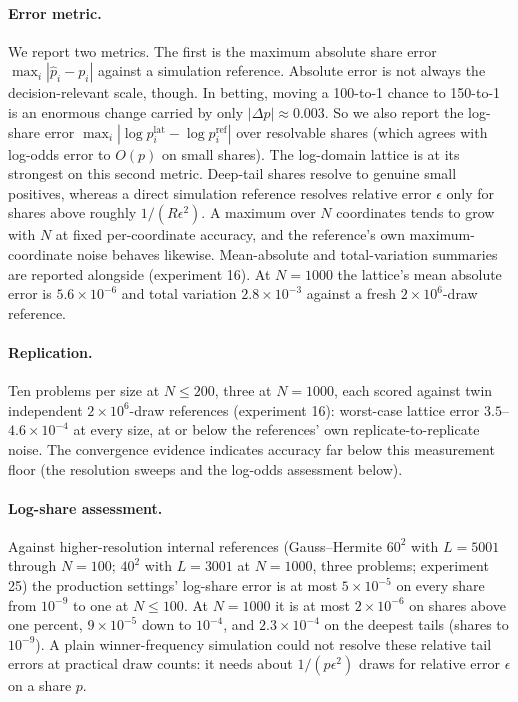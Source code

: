 \documentclass[12pt]{article}
\theoremstyle{remark}
\begin{document}
\paragraph{Error metric.} We report two metrics. The first is the
maximum absolute share error $\max_i |\hat p_i - p_i|$ against a
simulation reference. Absolute error is not always the decision-relevant
scale, though. In betting, moving a 100-to-1 chance to 150-to-1 is an
enormous change carried by only $|\Delta p| \approx 0.003$. So we also
report the log-share error $\max_i |\log p^{\mathrm{lat}}_i -
\log p_i^{\mathrm{ref}}|$ over resolvable shares (which agrees with
log-odds error to $O(p)$ on small shares). The log-domain lattice is at
its strongest on this second metric. Deep-tail shares resolve to genuine
small positives, whereas a direct simulation reference resolves relative
error $\epsilon$ only for shares above roughly $1/(R\epsilon^2)$. A maximum over $N$ coordinates tends to grow with $N$ at fixed
per-coordinate accuracy, and the reference's own maximum-coordinate noise
behaves likewise. Mean-absolute and total-variation summaries are
reported alongside (experiment 16). At $N=1000$ the lattice's mean
absolute error is
$5.6\times10^{-6}$ and total variation $2.8\times10^{-3}$ against a fresh
$2\times10^6$-draw reference.

\paragraph{Replication.} Ten problems per size at $N \le 200$, three at
$N=1000$, each scored against twin independent $2\times10^6$-draw
references (experiment 16): worst-case lattice error
$3.5$--$4.6\times10^{-4}$ at every size, at or below the references' own
replicate-to-replicate noise. The convergence evidence indicates accuracy far
below this measurement floor (the resolution sweeps and the log-odds
assessment below).

\paragraph{Log-share assessment.} Against higher-resolution internal references
(Gauss--Hermite $60^2$ with $L=5001$ through $N=100$; $40^2$ with
$L=3001$ at $N=1000$, three problems; experiment 25) the production
settings' log-share error is at most $5\times10^{-5}$ on every share from
$10^{-9}$ to one at $N \le 100$. At $N=1000$ it is at most
$2\times10^{-6}$ on shares above one percent, $9\times10^{-5}$ down to
$10^{-4}$, and $2.3\times10^{-4}$ on the deepest tails (shares to
$10^{-9}$). A plain winner-frequency simulation could not resolve these
relative tail errors at practical draw counts: it needs about
$1/(p\epsilon^2)$ draws for relative error $\epsilon$ on a share $p$.
\end{document}
